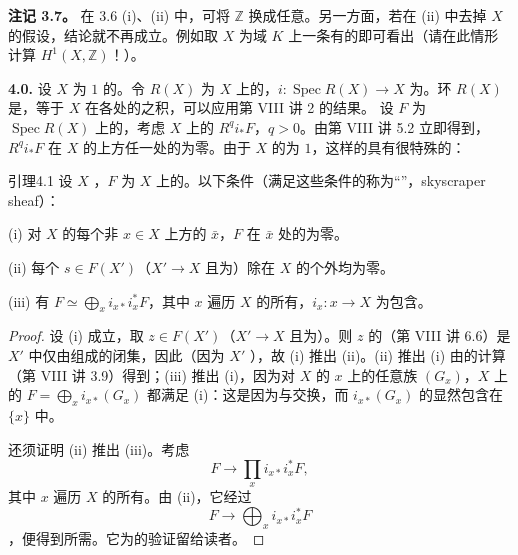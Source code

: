 \textbf{注记 3.7。} 在 3.6 (i)、(ii) 中，可将 $\mathbb Z$ 换成任意。另一方面，若在 (ii) 中去掉 $X$ 的假设，结论就不再成立。例如取 $X$ 为域 $K$ 上一条有的即可看出（请在此情形计算 $H^1(X,\mathbb Z)$！）。

\textbf{4.0.} 设 $X$ 为 $1$ 的。令 $R(X)$ 为 $X$ 上的，$i:\operatorname{Spec}R(X)\to X$ 为。环 $R(X)$ 是，等于 $X$ 在各处的之积，可以应用第 VIII 讲 2 的结果。
设 $F$ 为 $\operatorname{Spec}R(X)$ 上的，考虑 $X$ 上的 $R^qi_*F$，$q>0$。由第 VIII 讲 5.2 立即得到，$R^qi_*F$ 在 $X$ 的上方任一处的为零。由于 $X$ 的为 $1$，这样的具有很特殊的：
\begin{SGAresult}{引理}{4.1}
设 $X$ ，$F$ 为 $X$ 上的。以下条件（满足这些条件的称为“”，skyscraper sheaf）：

(i) 对 $X$ 的每个非 $x\in X$ 上方的 $\bar x$，$F$ 在 $\bar x$ 处的为零。

(ii) 每个 $s\in F(X')$（$X'\to X$ 且为）除在 $X$ 的个外均为零。

(iii) 有 $F\simeq\bigoplus_xi_{x*}i_x^*F$，其中 $x$ 遍历 $X$ 的所有，$i_x:x\to X$ 为包含。
\end{SGAresult}
\begin{proof}
设 (i) 成立，取 $z\in F(X')$（$X'\to X$ 且为）。则 $z$ 的（第 VIII 讲 6.6）是 $X'$ 中仅由组成的闭集，因此（因为 $X'$ ），故 (i) 推出 (ii)。(ii) 推出 (i) 由的计算（第 VIII 讲 3.9）得到；(iii) 推出 (i)，因为对 $X$ 的 $x$ 上的任意族 $(G_x)$，$X$ 上的 $F=\bigoplus_xi_{x*}(G_x)$ 都满足 (i)：这是因为与交换，而 $i_{x*}(G_x)$ 的显然包含在 $\{x\}$ 中。

还须证明 (ii) 推出 (iii)。考虑
\[
F\longrightarrow\prod_xi_{x*}i_x^*F,
\]
其中 $x$ 遍历 $X$ 的所有。由 (ii)，它经过
\[
F\longrightarrow\bigoplus_xi_{x*}i_x^*F
\]
，便得到所需。它为的验证留给读者。
\end{proof}
